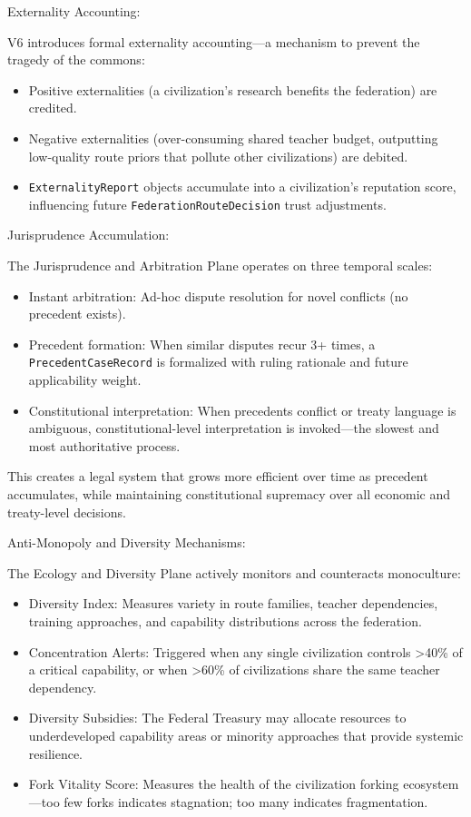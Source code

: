 \documentclass[12pt,a4paper]{article}
\begin{document}
Externality Accounting:

V6 introduces formal externality accounting---a mechanism to prevent the tragedy of the commons:
\begin{itemize}
  \item Positive externalities (a civilization's research benefits the federation) are credited.
  \item Negative externalities (over-consuming shared teacher budget, outputting low-quality route priors that pollute other civilizations) are debited.
  \item \texttt{ExternalityReport} objects accumulate into a civilization's reputation score, influencing future \texttt{FederationRouteDecision} trust adjustments.
\end{itemize}


Jurisprudence Accumulation:

The Jurisprudence and Arbitration Plane operates on three temporal scales:
\begin{itemize}
  \item Instant arbitration: Ad-hoc dispute resolution for novel conflicts (no precedent exists).
  \item Precedent formation: When similar disputes recur 3+ times, a \texttt{PrecedentCaseRecord} is formalized with ruling rationale and future applicability weight.
  \item Constitutional interpretation: When precedents conflict or treaty language is ambiguous, constitutional-level interpretation is invoked---the slowest and most authoritative process.
\end{itemize}


This creates a legal system that grows more efficient over time as precedent accumulates, while maintaining constitutional supremacy over all economic and treaty-level decisions.

Anti-Monopoly and Diversity Mechanisms:

The Ecology and Diversity Plane actively monitors and counteracts monoculture:
\begin{itemize}
  \item Diversity Index: Measures variety in route families, teacher dependencies, training approaches, and capability distributions across the federation.
  \item Concentration Alerts: Triggered when any single civilization controls >40\% of a critical capability, or when >60\% of civilizations share the same teacher dependency.
  \item Diversity Subsidies: The Federal Treasury may allocate resources to underdeveloped capability areas or minority approaches that provide systemic resilience.
  \item Fork Vitality Score: Measures the health of the civilization forking ecosystem---too few forks indicates stagnation; too many indicates fragmentation.
\end{itemize}
\end{document}
